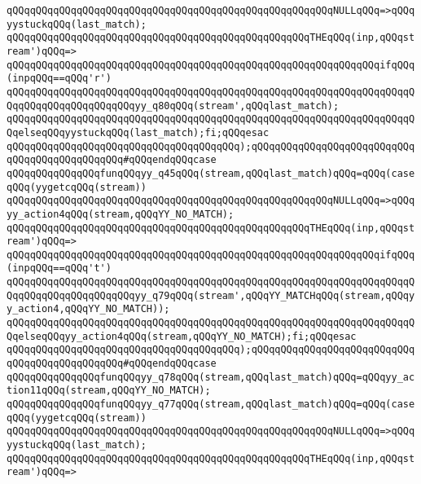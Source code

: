 \verb|qQQqqQQqqQQqqQQqqQQqqQQqqQQqqQQqqQQqqQQqqQQqqQQqqQQqqQQqNULLqQQq=>qQQqyystuckqQQq(last_match);|\newline
\verb|qQQqqQQqqQQqqQQqqQQqqQQqqQQqqQQqqQQqqQQqqQQqqQQqqQQqTHEqQQq(inp,qQQqstream')qQQq=>|\newline
\verb|qQQqqQQqqQQqqQQqqQQqqQQqqQQqqQQqqQQqqQQqqQQqqQQqqQQqqQQqqQQqqQQqifqQQq(inpqQQq==qQQq'r')|\newline
\verb|qQQqqQQqqQQqqQQqqQQqqQQqqQQqqQQqqQQqqQQqqQQqqQQqqQQqqQQqqQQqqQQqqQQqqQQqqQQqqQQqqQQqqQQqqQQqyy_q80qQQq(stream',qQQqlast_match);|\newline
\verb|qQQqqQQqqQQqqQQqqQQqqQQqqQQqqQQqqQQqqQQqqQQqqQQqqQQqqQQqqQQqqQQqqQQqqQQqelseqQQqyystuckqQQq(last_match);fi;qQQqesac|\newline
\verb|qQQqqQQqqQQqqQQqqQQqqQQqqQQqqQQqqQQqqQQq);qQQqqQQqqQQqqQQqqQQqqQQqqQQqqQQqqQQqqQQqqQQqqQQq#qQQqendqQQqcase|\newline
\verb|qQQqqQQqqQQqqQQqfunqQQqyy_q45qQQq(stream,qQQqlast_match)qQQq=qQQq(caseqQQq(yygetcqQQq(stream))|\newline
\verb|qQQqqQQqqQQqqQQqqQQqqQQqqQQqqQQqqQQqqQQqqQQqqQQqqQQqqQQqNULLqQQq=>qQQqyy_action4qQQq(stream,qQQqYY_NO_MATCH);|\newline
\verb|qQQqqQQqqQQqqQQqqQQqqQQqqQQqqQQqqQQqqQQqqQQqqQQqqQQqTHEqQQq(inp,qQQqstream')qQQq=>|\newline
\verb|qQQqqQQqqQQqqQQqqQQqqQQqqQQqqQQqqQQqqQQqqQQqqQQqqQQqqQQqqQQqqQQqifqQQq(inpqQQq==qQQq't')|\newline
\verb|qQQqqQQqqQQqqQQqqQQqqQQqqQQqqQQqqQQqqQQqqQQqqQQqqQQqqQQqqQQqqQQqqQQqqQQqqQQqqQQqqQQqqQQqqQQqyy_q79qQQq(stream',qQQqYY_MATCHqQQq(stream,qQQqyy_action4,qQQqYY_NO_MATCH));|\newline
\verb|qQQqqQQqqQQqqQQqqQQqqQQqqQQqqQQqqQQqqQQqqQQqqQQqqQQqqQQqqQQqqQQqqQQqqQQqelseqQQqyy_action4qQQq(stream,qQQqYY_NO_MATCH);fi;qQQqesac|\newline
\verb|qQQqqQQqqQQqqQQqqQQqqQQqqQQqqQQqqQQqqQQq);qQQqqQQqqQQqqQQqqQQqqQQqqQQqqQQqqQQqqQQqqQQqqQQq#qQQqendqQQqcase|\newline
\verb|qQQqqQQqqQQqqQQqfunqQQqyy_q78qQQq(stream,qQQqlast_match)qQQq=qQQqyy_action11qQQq(stream,qQQqYY_NO_MATCH);|\newline
\verb|qQQqqQQqqQQqqQQqfunqQQqyy_q77qQQq(stream,qQQqlast_match)qQQq=qQQq(caseqQQq(yygetcqQQq(stream))|\newline
\verb|qQQqqQQqqQQqqQQqqQQqqQQqqQQqqQQqqQQqqQQqqQQqqQQqqQQqqQQqNULLqQQq=>qQQqyystuckqQQq(last_match);|\newline
\verb|qQQqqQQqqQQqqQQqqQQqqQQqqQQqqQQqqQQqqQQqqQQqqQQqqQQqTHEqQQq(inp,qQQqstream')qQQq=>|\newline

